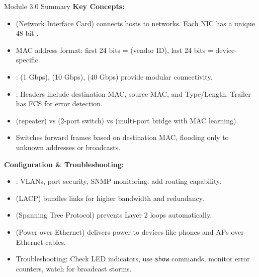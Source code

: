 \documentclass[aspectratio=169]{beamer}  %
\begin{document}
\begin{frame}[t,allowframebreaks]{Module 3.0 Summary}
    \small
    \textbf{Key Concepts:}
    \begin{itemize}
        \item {} (Network Interface Card) connects hosts to networks. Each NIC has a unique 48-bit .
        \item MAC address format: first 24 bits =  (vendor ID), last 24 bits = device-specific.
        \item {}:  (1 Gbps),  (10 Gbps),  (40 Gbps) provide modular connectivity.
        \item {}: Headers include destination MAC, source MAC, and Type/Length. Trailer has FCS for error detection.
        \item {} (repeater) vs  (2-port switch) vs  (multi-port bridge with MAC learning).
        \item Switches forward frames based on destination MAC, flooding only to unknown addresses or broadcasts.
    \end{itemize}
    \framebreak
    
    \vspace{0.3em}
    \textbf{Configuration \& Troubleshooting:}
    \begin{itemize}
        \item {}: VLANs, port security, SNMP monitoring.  add routing capability.
        \item {} (LACP) bundles links for higher bandwidth and redundancy.
        \item {} (Spanning Tree Protocol) prevents Layer 2 loops automatically.
        \item {} (Power over Ethernet) delivers power to devices like phones and APs over Ethernet cables.
        \item Troubleshooting: Check LED indicators, use \texttt{show} commands, monitor error counters, watch for broadcast storms.
    \end{itemize}
\end{frame}

\end{document}
